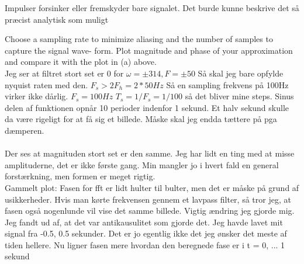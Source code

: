 \begin{Opgaver}
\begin{kapitel}
\begin{Opgave}
\begin{UnderOpgave}
                Impulser forsinker eller fremskyder bare signalet.
                Det burde kunne beskrive det så præcist analytisk som muligt
                \vspace{150pt}
            \end{UnderOpgave}
            \begin{UnderOpgave}
            \end{UnderOpgave}

            \begin{UnderOpgave}
                Choose a sampling rate to minimize aliasing and the number of samples to capture the signal wave-
                form. Plot magnitude and phase of your approximation and compare it with the
                plot in (a) above.\\
                Jeg ser at filtret stort set er 0 for $\omega = \pm 314, F = \pm 50$
                Så skal jeg bare opfylde nyquist raten med den. 
                $F_s > 2F_h = 2 * 50Hz$
                Så en sampling frekvens på 100Hz virker ikke dårlig. $F_s = 100Hz$
                $T_s = 1/F_s = 1/100$ så det bliver mine steps.
                Sinus delen af funktionen opnår 10 perioder indenfor 1 sekund. Et halv sekund skulle da være rigeligt for at få sig et billede. Måske skal jeg endda tættere på pga dæmperen. 
                \\\\
                Der ses at magnituden stort set er den samme. Jeg har lidt en ting med at misse amplituderne, det er ikke første gang. 
                Min mangler jo i hvert fald en general forstærkning, men formen er meget rigtig.\\              
                \color{red}Gammelt plot: Fasen for fft er lidt hulter til bulter, men det er måske på grund af usikkerheder. 
                Hvis man kørte frekvensen gennem et lavpass filter, så tror jeg, at fasen også nogenlunde vil vise det samme billede. 
                \color{black}Vigtig ændring jeg gjorde mig. Jeg fandt ud af, at det var antikausulitet som gjorde det.
                Jeg havde lavet mit signal fra -0.5, 0.5 sekunder. Det er jo egentlig ikke det jeg ønsker det meste af tiden hellere. 
                Nu ligner fasen mere hvordan den beregnede fase er i t = 0, ... 1 sekund
            \end{UnderOpgave}

\end{Opgave}
\end{kapitel}
\end{Opgaver}
